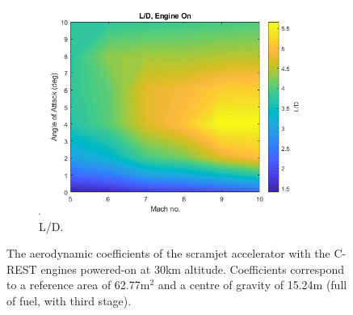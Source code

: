 \begin{figure}[!ht]
\begin{subfigure}{.5\textwidth}
				\includegraphics[width=0.99\linewidth]{figures/3_vehicle_design/LD-EngineOn}
				\caption{L/D.}
				\label{fig:LD-EngineOn}
			\end{subfigure}
			\caption{The aerodynamic coefficients of the scramjet accelerator with the C-REST engines powered-on at 30km altitude. Coefficients correspond to a reference area of 62.77m$^2$ and a centre of gravity of 15.24m (full of fuel, with third stage). }%
			\label{fig:EngineOnAero}
		\end{figure}
		
		

